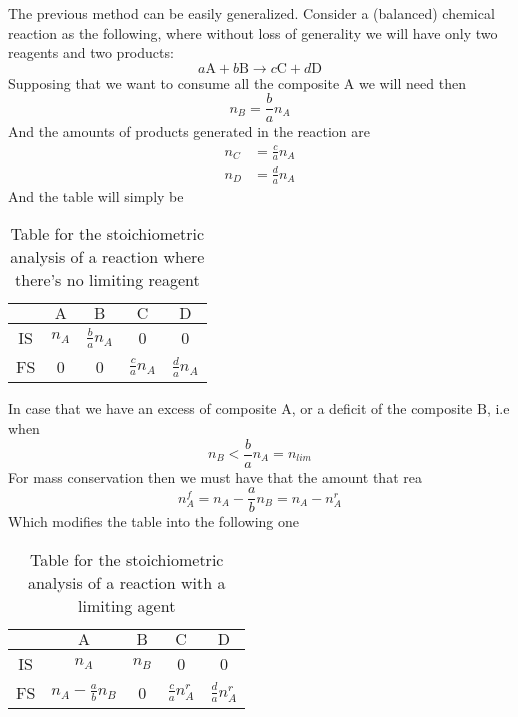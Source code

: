 \documentclass[../qm.tex]{subfiles}
\begin{document}
\begin{mtd}
	The previous method can be easily generalized. Consider a (balanced) chemical reaction as the following, where without loss of generality we will have only two reagents and two products:
	\begin{equation*}
		a\mathrm{A}+b\mathrm{B}\to c\mathrm{C}+d\mathrm{D}
	\end{equation*}
	Supposing that we want to consume all the composite $\mathrm{A}$ we will need then
	\begin{equation*}
		n_{B}=\frac{b}{a}n_{A}
	\end{equation*}
	And the amounts of products generated in the reaction are
	\begin{equation*}
		\begin{aligned}
			n_{C}&= \frac{c}{a}n_A\\
			n_{D}&= \frac{d}{a}n_A
		\end{aligned}
	\end{equation*}
	And the table will simply be
	\begin{table}[H]
		\centering
		\begin{tabular}{c|c|c|c|c|}
			&$\mathrm{A}$&$\mathrm{B}$&$\mathrm{C}$&$\mathrm{D}$\\\hline
			IS&$n_A$&$\frac{b}{a}n_A$&0&0\\\hline
			FS&0&0&$\frac{c}{a}n_A$&$\frac{d}{a}n_A$\\\hline
		\end{tabular}
		\caption{Table for the stoichiometric analysis of a reaction where there's no limiting reagent}
		\label{tab:nolim.chem}
	\end{table}
	In case that we have an excess of composite $\mathrm{A}$, or a deficit of the composite $\mathrm{B}$, i.e when
	\begin{equation*}
		n_B<\frac{b}{a}n_A=n_{lim}
	\end{equation*}
	For mass conservation then we must have that the amount that rea
	\begin{equation*}
		n_A^{f}=n_A-\frac{a}{b}n_B=n_A-n_A^r
	\end{equation*}
	Which modifies the table into the following one
	\begin{table}[H]
		\centering
		\begin{tabular}{c|c|c|c|c|}
			&$\mathrm{A}$&$\mathrm{B}$&$\mathrm{C}$&$\mathrm{D}$\\\hline
			IS&$n_A$&$n_B$&0&0\\\hline
			FS&$n_A-\frac{a}{b}n_B$&0&$\frac{c}{a}n_A^r$&$\frac{d}{a}n_A^r$\\\hline
		\end{tabular}
		\caption{Table for the stoichiometric analysis of a reaction with a limiting agent}
		\label{tab:nolim.chem}
	\end{table}
\end{mtd}
\end{document}
